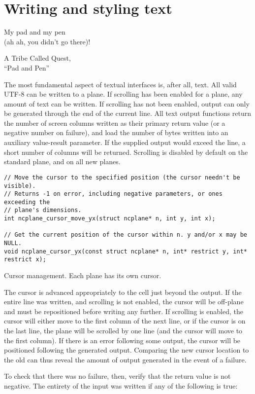 \section{Writing and styling text}
\label{sec:output}
\epigraph{My pad and my pen\\(ah ah, you didn't go there)!}{A Tribe Called Quest,\\``Pad and Pen''}
The most fundamental aspect of textual interfaces is, after all, text. All
valid UTF-8 can be written to a plane. If scrolling has been enabled for a
plane, any amount of text can be written. If scrolling has not been enabled,
output can only be generated through the end of the current line. All text
output functions return the number of screen columns written as their primary
return value (or a negative number on failure), and load the number of bytes
written into an auxiliary value-result parameter. If the supplied output would
exceed the line, a short number of columns will be returned. Scrolling is
disabled by default on the standard plane, and on all new planes.

\begin{listing}[!htb]
\begin{verbatim}
// Move the cursor to the specified position (the cursor needn't be visible).
// Returns -1 on error, including negative parameters, or ones exceeding the
// plane's dimensions.
int ncplane_cursor_move_yx(struct ncplane* n, int y, int x);

// Get the current position of the cursor within n. y and/or x may be NULL.
void ncplane_cursor_yx(const struct ncplane* n, int* restrict y, int* restrict x);
\end{verbatim}
\caption{Cursor management. Each plane has its own cursor.}
\label{list:cursor}
\end{listing}

The cursor is advanced appropriately to the cell just beyond the output. If the
entire line was written, and scrolling is not enabled, the cursor will be
off-plane and must be repositioned before writing any further. If scrolling is
enabled, the cursor will either move to the first column of the next line, or
if the cursor is on the last line, the plane will be scrolled by one line (and
the cursor will move to the first column). If there is an error following some
output, the cursor will be positioned following the generated output. Comparing
the new cursor location to the old can thus reveal the amount of output generated
in the event of a failure.

To check that there was no failure, then, verify that the return value is not
negative. The entirety of the input was written if any of the following is
true:

